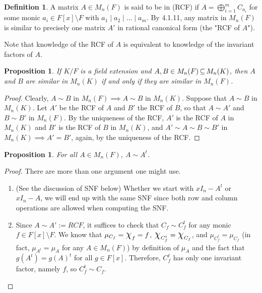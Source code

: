 \documentclass[11pt]{book}
\newcounter{counter}
\newtheorem{proposition}[counter]{Proposition}   \newtheorem{problem}[counter]{Problem}   \newtheorem*{proposition*}{Proposition}   \newtheorem*{lemma*}{Lemma}
\theoremstyle{definition}   \newtheorem{defn}[counter]{Definition} %
\newcommand{\bs}{\setminus}   \newcommand{\A}{\mathcal{A}}   \newcommand{\sy}{\textnormal{Syl}}   \newcommand{\size}[1]{\left| #1 \right|}
\newcommand{\Chi}{\mbox{\Large $\chi$}}
\newcommand{\vs}{\vspace{8pt}}
\numberwithin{counter}{chapter}
\begin{document}
\vs

\begin{defn}
A matrix $A \in M_n(F)$ is said to be in  (RCF) if $A = \bigoplus_{i=1}^m C_{a_i}$ for some monic $a_i \in F[x]\bs F$ with $a_1 \mid a_2 \mid \dots \mid a_m$. By 4.1.11, any matrix in $M_n(F)$ is similar to precisely one matrix $A'$ in rational canonical form  (the "RCF of $A$"). 
\end{defn}

Note that knowledge of the RCF of $A$ is equivalent to knowledge of the invariant factors of $A$.

\vs

\begin{proposition}
If $K/F$ is a field extension and $A,B \in M_n(F) \operatorname{\subseteq} M_n(K)$, then $A$ and $B$ are similar in $M_n(K)$ if and only if they are similar in $M_n(F)$. 
\end{proposition}

\begin{proof}
Clearly, $A \sim B$ in $M_n(F) \implies A \sim B$ in $M_n(K)$. Suppose that $A \sim B$ in $M_n(K)$. Let $A'$ be the RCF of $A$ and $B'$ the RCF of $B$, so that $A \sim A'$ and $B \sim B'$ in $M_n(F)$. By the uniqueness of the RCF, $A'$ is the RCF of $A$ in $M_n(K)$ and $B'$ is the RCF of $B$ in $M_n(K)$, and $A' \sim A \sim B \sim B'$ in $M_n(K) \implies A' = B'$, again, by the uniqueness of the RCF.
\end{proof} 

\vs

\begin{proposition}
For all $A \in M_n(F)$, $A \sim A^t$.
\end{proposition}

\begin{proof}
 There are more than one argument one might use.
 \begin{enumerate}
 \item[(1)] (See the discussion of SNF below) Whether we start with $xI_n - A^t$ or $xI_n - A$, we will end up with the same SNF since both row and column operations are allowed when computing the SNF.
 \item[(2)] Since $A \sim A' := RCF$, it suffices to check that $C_f \sim C_f^t$ for any monic $f \in F[x]\bs F$. We know that $\mu_{C_f} = \Chi_f = f$, $\Chi_{C_f^t} = \Chi_{C_f}$, and $\mu_{C_f^t} = \mu_{C_f}$ (in fact, $\mu_{A^t} = \mu_A$ for any $A \in M_n(F)$) by definition of $\mu_A$ and the fact that $g(A^t) = g(A)^t$ for all $g \in F[x]$. Therefore, $C_f^t$ has only one invariant factor, namely $f$, so $C_f^t \sim C_f$. 
 \end{enumerate}
\end{proof}
\end{document}
